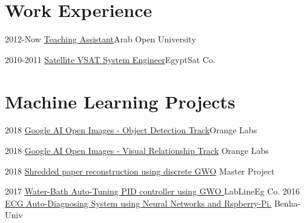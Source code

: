\documentclass[letterpaper]{twentysecondcv} %
\begin{document}

\section{Work Experience}

\begin{twenty} %
    \twentyitem
	{2012-Now}   
    {\href{http://www.aou.edu.eg}{Teaching Assistant}}{Arab Open University} {}

    \twentyitem
    	{2010-2011}   
        {\href{http://www.egyptsat.com}{Satellite VSAT System Engineer}}{EgyptSat Co.} {}

\end{twenty}

\section{Machine Learning Projects}
\begin{twenty} %
    \twentyitem
 		{2018}   {\href{https://www.kaggle.com/c/google-ai-open-images-object-detection-track}{Google AI Open Images - Object Detection Track}}{Orange Labs} {}
        
    \twentyitem
   		{2018}       {\href{https://www.kaggle.com/c/google-ai-open-images-visual-relationship-track}{Google AI Open Images - Visual Relationship Track}}
        {Orange Labs} {}
        
    \twentyitem
   		{2018}
        {\href{https://}{Shredded paper reconstruction using discrete GWO}}
        {Master Project} {} {}
        
    \twentyitem
   		{2017}
        {\href{http://www.lablineeg.com}{Water-Bath Auto-Tuning PID controller using GWO }}
        {LabLineEg Co.}
        {} {
         } 
\twentyitem
   		{2016}
        {\href{https://github.com/supereng/HB-Python/blob/master/ECG3-Python.ipynb}{ECG Auto-Diagnosing System using Neural Networks and Rspberry-Pi.}}
        {Benha-Univ}
        {} {
        }
        
\end{twenty}
\end{document}
